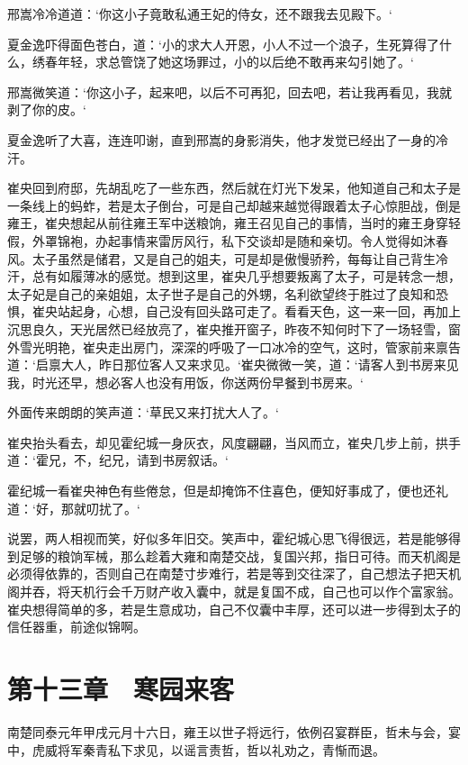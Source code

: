 邢嵩冷冷道道：‘你这小子竟敢私通王妃的侍女，还不跟我去见殿下。‘

夏金逸吓得面色苍白，道：‘小的求大人开恩，小人不过一个浪子，生死算得了什么，绣春年轻，求总管饶了她这场罪过，小的以后绝不敢再来勾引她了。‘

邢嵩微笑道：‘你这小子，起来吧，以后不可再犯，回去吧，若让我再看见，我就剥了你的皮。‘

夏金逸听了大喜，连连叩谢，直到邢嵩的身影消失，他才发觉已经出了一身的冷汗。

崔央回到府邸，先胡乱吃了一些东西，然后就在灯光下发呆，他知道自己和太子是一条线上的蚂蚱，若是太子倒台，可是自己却越来越觉得跟着太子心惊胆战，倒是雍王，崔央想起从前往雍王军中送粮饷，雍王召见自己的事情，当时的雍王身穿轻假，外罩锦袍，办起事情来雷厉风行，私下交谈却是随和亲切。令人觉得如沐春风。太子虽然是储君，又是自己的姐夫，可是却是傲慢骄矜，每每让自己背生冷汗，总有如履薄冰的感觉。想到这里，崔央几乎想要叛离了太子，可是转念一想，太子妃是自己的亲姐姐，太子世子是自己的外甥，名利欲望终于胜过了良知和恐惧，崔央站起身，心想，自己没有回头路可走了。看看天色，这一来一回，再加上沉思良久，天光居然已经放亮了，崔央推开窗子，昨夜不知何时下了一场轻雪，窗外雪光明艳，崔央走出房门，深深的呼吸了一口冰冷的空气，这时，管家前来禀告道：‘启禀大人，昨日那位客人又来求见。‘崔央微微一笑，道：‘请客人到书房来见我，时光还早，想必客人也没有用饭，你送两份早餐到书房来。‘

外面传来朗朗的笑声道：‘草民又来打扰大人了。‘

崔央抬头看去，却见霍纪城一身灰衣，风度翩翩，当风而立，崔央几步上前，拱手道：‘霍兄，不，纪兄，请到书房叙话。‘

霍纪城一看崔央神色有些倦怠，但是却掩饰不住喜色，便知好事成了，便也还礼道：‘好，那就叨扰了。‘

说罢，两人相视而笑，好似多年旧交。笑声中，霍纪城心思飞得很远，若是能够得到足够的粮饷军械，那么趁着大雍和南楚交战，复国兴邦，指日可待。而天机阁是必须得依靠的，否则自己在南楚寸步难行，若是等到交往深了，自己想法子把天机阁并吞，将天机行会千万财产收入囊中，就是复国不成，自己也可以作个富家翁。崔央想得简单的多，若是生意成功，自己不仅囊中丰厚，还可以进一步得到太子的信任器重，前途似锦啊。

\chapter{第十三章　寒园来客}

南楚同泰元年甲戌元月十六日，雍王以世子将远行，依例召宴群臣，哲未与会，宴中，虎威将军秦青私下求见，以谣言责哲，哲以礼劝之，青惭而退。

